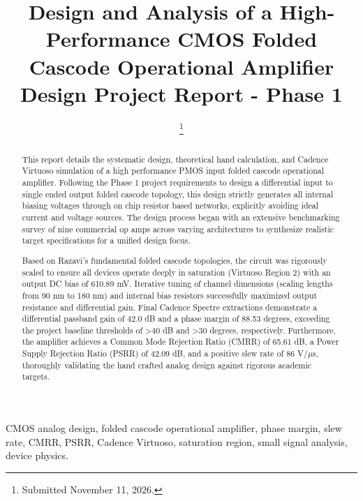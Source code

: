 \documentclass[conference]{IEEEtran}
\begin{document}
\title{Design and Analysis of a High-Performance CMOS Folded Cascode Operational Amplifier\\
{\large Design Project Report - Phase 1}}
\author{
\thanks{Submitted November 11, 2026.}
}
\maketitle

\begin{abstract}
This report details the systematic design, theoretical hand calculation, and Cadence Virtuoso simulation of a high performance PMOS input folded cascode operational amplifier. Following the Phase 1 project requirements to design a differential input to single ended output folded cascode topology, this design strictly generates all internal biasing voltages through on chip resistor based networks, explicitly avoiding ideal current and voltage sources. The design process began with an extensive benchmarking survey of nine commercial op amps across varying architectures to synthesize realistic target specifications for a unified design focus. 

Based on Razavi's fundamental folded cascode topologies, the circuit was rigorously scaled to ensure all devices operate deeply in saturation (Virtuoso Region 2) with an output DC bias of 610.89 mV. Iterative tuning of channel dimensions (scaling lengths from 90 nm to 180 nm) and internal bias resistors successfully maximized output resistance and differential gain. Final Cadence Spectre extractions demonstrate a differential passband gain of 42.0 dB and a phase margin of 88.53 degrees, exceeding the project baseline thresholds of >40 dB and >30 degrees, respectively. Furthermore, the amplifier achieves a Common Mode Rejection Ratio (CMRR) of 65.61 dB, a Power Supply Rejection Ratio (PSRR) of 42.09 dB, and a positive slew rate of 86 V/$\mu$s, thoroughly validating the hand crafted analog design against rigorous academic targets.
\end{abstract}

\begin{IEEEkeywords}
CMOS analog design, folded cascode operational amplifier, phase margin, slew rate, CMRR, PSRR, Cadence Virtuoso, saturation region, small signal analysis, device physics.
\end{IEEEkeywords}
\end{document}
